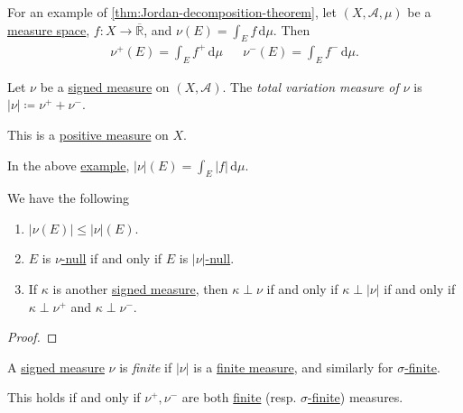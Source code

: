 \begin{eg}\label{eg:lec30}
	For an example of \autoref{thm:Jordan-decomposition-theorem}, let \((X, \mathcal{A}, \mu)\) be a \hyperref[def:measure-space]{measure space},
	\(f \colon X \to \overline{\mathbb{R}}\), and \(\nu(E) = \int_E f \,\mathrm{d} \mu\). Then
	\begin{align*}
		\nu^+(E) = \int_E f^+ \,\mathrm{d} \mu &  & \nu^-(E) = \int_E f^- \,\mathrm{d} \mu.
	\end{align*}
\end{eg}

\begin{definition}\label{def:total-variation}
	Let \(\nu\) be a \hyperref[def:signed-measure]{signed measure} on \((X, \mathcal{A})\). The \emph{total variation measure of \(\nu\)} is
	\(\left\vert \nu \right\vert \coloneqq \nu^+ + \nu^-\).
\end{definition}
\begin{remark}
	This is a \hyperref[def:signed-measure]{positive measure} on $X$.
\end{remark}

\begin{eg}
	In the above \hyperref[eg:lec30]{example}, \(\left\vert \nu \right\vert (E) = \int_E \left\vert f \right\vert \,\mathrm{d} \mu\).
\end{eg}

\begin{lemma}
	We have the following
	\begin{enumerate}
		\item \(\left\vert \nu(E) \right\vert \leq \left\vert \nu \right\vert(E)\).
		\item \(E\) is \hyperref[def:null-set-for-a-signed-measure]{\(\nu\)-null} if and only if \(E\) is \hyperref[def:null-set-for-a-signed-measure]{\(\left\vert \nu \right\vert\)-null}.
		\item If \(\kappa\) is another \hyperref[def:signed-measure]{signed measure}, then \(\kappa \perp \nu\)
		      if and only if \(\kappa \perp \left\vert \nu \right\vert\) if and only if \(\kappa \perp \nu^+\) and \(\kappa \perp \nu^-\).
	\end{enumerate}
\end{lemma}
\begin{proof}
\end{proof}

\begin{definition}\label{def:finite-signed-measure}
	A \hyperref[def:signed-measure]{signed measure} \(\nu\) is \emph{finite} if \(\left\vert \nu \right\vert\) is a \hyperref[def:finite-measure]{finite measure},
	and similarly for \hyperref[def:finite-measure]{\(\sigma\)-finite}.

	This holds if and only if \(\nu^+,\nu^-\) are both \hyperref[def:finite-measure]{finite} (resp. \hyperref[def:finite-measure]{\(\sigma\)-finite}) measures.
\end{definition}

